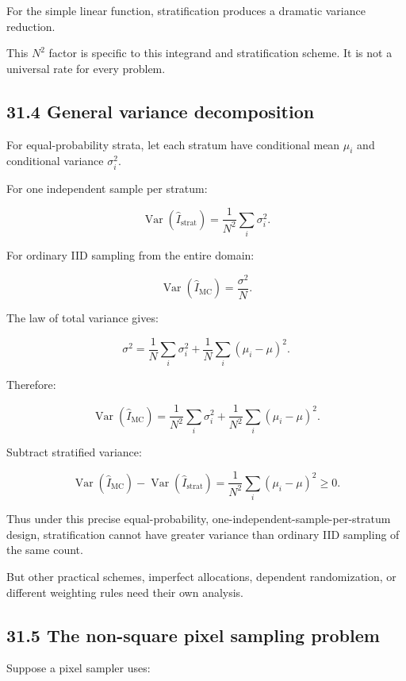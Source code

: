 For the simple linear function, stratification produces a dramatic variance reduction.

This \(N^2\) factor is specific to this integrand and stratification scheme. It is not a universal rate for every problem.

\subsection{31.4 General variance decomposition}\label{02-foundations-ii-ch031-general-variance-decomposition}

For equal-probability strata, let each stratum have conditional mean \(\mu_i\) and conditional variance \(\sigma_i^2\).

For one independent sample per stratum:

\[ \boxed{ \operatorname{Var}(\widehat I_{\mathrm{strat}}) = \frac1{N^2}\sum_i\sigma_i^2 }. \]

For ordinary IID sampling from the entire domain:

\[ \operatorname{Var}(\widehat I_{\mathrm{MC}}) = \frac{\sigma^2}{N}. \]

The law of total variance gives:

\[ \sigma^2= \frac1N\sum_i\sigma_i^2 + \frac1N\sum_i(\mu_i-\mu)^2. \]

Therefore:

\[ \operatorname{Var}(\widehat I_{\mathrm{MC}}) = \frac1{N^2}\sum_i\sigma_i^2 + \frac1{N^2}\sum_i(\mu_i-\mu)^2. \]

Subtract stratified variance:

\[ \boxed{ \operatorname{Var}(\widehat I_{\mathrm{MC}}) - \operatorname{Var}(\widehat I_{\mathrm{strat}}) = \frac1{N^2}\sum_i(\mu_i-\mu)^2 \ge0 }. \]

Thus under this precise equal-probability, one-independent-sample-per-stratum design, stratification cannot have greater variance than ordinary IID sampling of the same count.

But other practical schemes, imperfect allocations, dependent randomization, or different weighting rules need their own analysis.

\subsection{31.5 The non-square pixel sampling problem}\label{02-foundations-ii-ch031-the-non-square-pixel-sampling-problem}

Suppose a pixel sampler uses:

